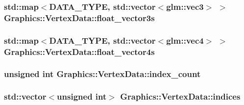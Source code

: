\subsubsection[{float\+\_\+vector3s}]{\setlength{\rightskip}{0pt plus 5cm}std\+::map$<${\bf D\+A\+T\+A\+\_\+\+T\+Y\+P\+E}, std\+::vector$<$glm\+::vec3$>$ $>$ Graphics\+::\+Vertex\+Data\+::float\+\_\+vector3s\hspace{0.3cm}{\ttfamily [private]}}\label{class_graphics_1_1_vertex_data_a5d84c110b57a1c72bf871da376f8ef16}
\hypertarget{class_graphics_1_1_vertex_data_a51c220f8d25f8f6f02a4024842579a7f}{}
\subsubsection[{float\+\_\+vector4s}]{\setlength{\rightskip}{0pt plus 5cm}std\+::map$<${\bf D\+A\+T\+A\+\_\+\+T\+Y\+P\+E}, std\+::vector$<$glm\+::vec4$>$ $>$ Graphics\+::\+Vertex\+Data\+::float\+\_\+vector4s\hspace{0.3cm}{\ttfamily [private]}}\label{class_graphics_1_1_vertex_data_a51c220f8d25f8f6f02a4024842579a7f}
\hypertarget{class_graphics_1_1_vertex_data_ad998da458e1adca27ad17487e9ae38c6}{}
\subsubsection[{index\+\_\+count}]{\setlength{\rightskip}{0pt plus 5cm}unsigned int Graphics\+::\+Vertex\+Data\+::index\+\_\+count\hspace{0.3cm}{\ttfamily [private]}}\label{class_graphics_1_1_vertex_data_ad998da458e1adca27ad17487e9ae38c6}
\hypertarget{class_graphics_1_1_vertex_data_a9b777aa4bf035e805b2957fbcd158842}{}
\subsubsection[{indices}]{\setlength{\rightskip}{0pt plus 5cm}std\+::vector$<$unsigned int$>$ Graphics\+::\+Vertex\+Data\+::indices\hspace{0.3cm}{\ttfamily [private]}}\label{class_graphics_1_1_vertex_data_a9b777aa4bf035e805b2957fbcd158842}
\hypertarget{class_graphics_1_1_vertex_data_a9d162343dbfbfec79b69e2f0b5658b23}{}
